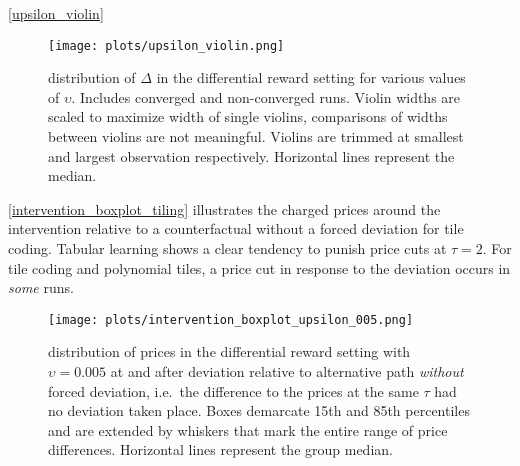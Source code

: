 \autoref{upsilon_violin}

\begin{figure}
	\texttt{[image: plots/upsilon\_violin.png]}
	\caption{distribution of $\Delta$ in the differential reward setting for various values of $\upsilon$. Includes converged and non-converged runs. Violin widths are scaled to maximize width of single violins, comparisons of widths between violins are not meaningful. Violins are trimmed at smallest and largest observation respectively. Horizontal lines represent the median.}
	\label{upsilon_violin}
\end{figure}

\autoref{intervention_boxplot_tiling} illustrates the charged prices around the intervention relative to a counterfactual without a forced deviation for tile coding. Tabular learning shows a clear tendency to punish price cuts at $\tau = 2$. For tile coding and polynomial tiles, a price cut in response to the deviation occurs in \emph{some} runs.

\begin{figure}
	\texttt{[image: plots/intervention\_boxplot\_upsilon\_005.png]}
	\caption{distribution of prices in the differential reward setting with $\upsilon = 0.005$ at and after deviation relative to alternative path \emph{without} forced deviation, i.e.\ the difference to the prices at the same $\tau$ had no deviation taken place. Boxes demarcate 15th and 85th percentiles and are extended by whiskers that mark the entire range of price differences. Horizontal lines represent the group median.}
	\label{intervention_boxplot_tiling}
\end{figure}